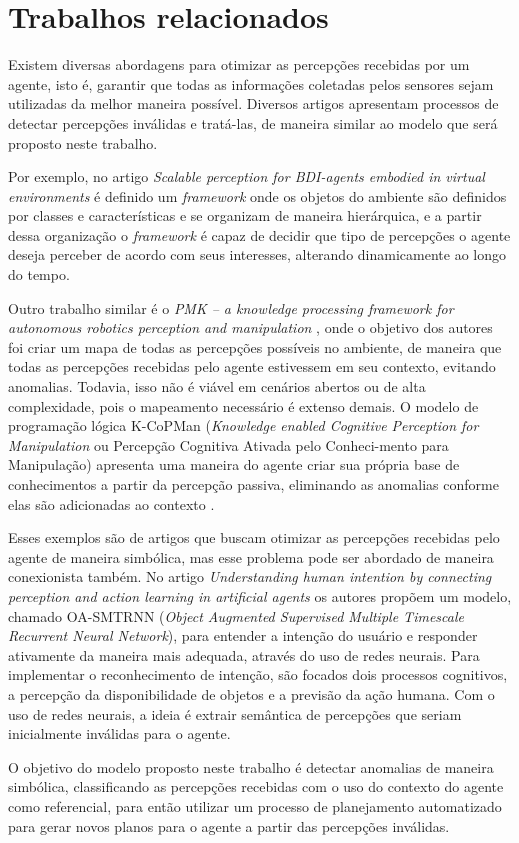 \section{Trabalhos relacionados}

Existem diversas abordagens para otimizar as percepções recebidas por um agente, isto é, garantir que todas as informações coletadas pelos sensores sejam utilizadas da melhor maneira possível. Diversos artigos apresentam processos de detectar percepções inválidas e tratá-las, de maneira similar ao modelo que será proposto neste trabalho.

Por exemplo, no artigo \emph{Scalable perception for BDI-agents embodied in virtual environments} \cite{van2011scalable} é definido um \emph{framework} onde os objetos do ambiente são definidos por classes e características e se organizam de maneira hierárquica, e a partir dessa organização o \emph{framework} é capaz de decidir que tipo de percepções o agente deseja perceber de acordo com seus interesses, alterando dinamicamente ao longo do tempo.
 
Outro trabalho similar é o \emph{PMK -- a knowledge processing framework for autonomous robotics perception and manipulation} \cite{Diab_2019}, onde o objetivo dos autores foi criar um mapa de todas as percepções possíveis no ambiente, de maneira que todas as percepções recebidas pelo agente estivessem em seu contexto, evitando anomalias. Todavia, isso não é viável em cenários abertos ou de alta complexidade, pois o mapeamento necessário é extenso demais. O modelo de programação lógica K-CoPMan (\textit{Knowledge enabled Cognitive Perception for Manipulation} ou Percepção Cognitiva Ativada pelo Conheci-mento para Manipulação) apresenta uma maneira do agente criar sua própria base de conhecimentos a partir da percepção passiva, eliminando as anomalias conforme elas são adicionadas ao contexto \cite{pangercic2010}.

Esses exemplos são de artigos que buscam otimizar as percepções recebidas pelo agente de maneira simbólica, mas esse problema pode ser abordado de maneira conexionista também. No artigo \emph{Understanding human intention by connecting perception and action learning in artificial agents} \cite{kim2017understanding} os autores propõem um modelo, chamado OA-SMTRNN (\textit{Object Augmented Supervised Multiple Timescale
Recurrent Neural Network}), para entender a intenção do usuário e responder ativamente da maneira mais adequada, através do uso de redes neurais. Para implementar o reconhecimento de intenção, são focados dois processos cognitivos, a percepção da disponibilidade de objetos e a previsão da ação humana. Com o uso de redes neurais, a ideia é extrair semântica de percepções que seriam inicialmente inválidas para o agente.

O objetivo do modelo proposto neste trabalho é detectar anomalias de maneira simbólica, classificando as percepções recebidas com o uso do contexto do agente como referencial, para então utilizar um processo de planejamento automatizado para gerar novos planos para o agente a partir das percepções inválidas.
